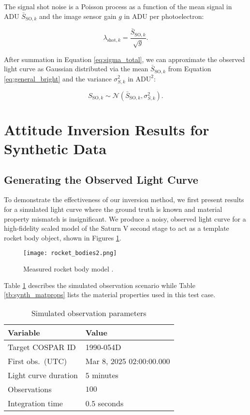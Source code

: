 \documentclass[a4paper,twocolumn]{spaceDebrisC} %
\newcommand{\figsmall}[0]{0.3\textwidth}
\begin{document}
The signal shot noise is a Poisson process as a function of the mean signal in ADU $\bar{S}_{\text{SO},k}$ and the image sensor gain $g$ in ADU per photoelectron:

\begin{equation}
  \lambda_{\text{shot},k} = \frac{\bar{S}_{\text{SO},k}}{\sqrt{g}}.
\end{equation}

After summation in Equation \ref{eq:sigma_total}, we can approximate the observed light curve as Gaussian distributed via the mean $\bar{S}_{\text{SO},k}$ from Equation \ref{eq:general_bright} and the variance $\sigma^2_{S,k}$ in $\text{ADU}^2$:

\begin{equation} \label{eq:lc_dist}
 S_{\text{SO},k} \sim \mathcal{N}\left( \bar{S}_{\text{SO},k}, \sigma^2_{S,k} \right).
 \end{equation}

\section{Attitude Inversion Results for Synthetic Data}

\subsection{Generating the Observed Light Curve}

To demonstrate the effectiveness of our inversion method, we first present results for a simulated light curve where the ground truth is known and material property mismatch is insignificant. We produce a noisy, observed light curve for a high-fidelity scaled model of the Saturn V second stage to act as a template rocket body object, shown in Figures \ref{fig:meas_model}.

\begin{figure}[H]
  \centering
  \texttt{[image: rocket\_bodies2.png]}
  \caption{Measured rocket body model \cite{nasa_models}.}
  \label{fig:meas_model}
\end{figure}

Table \ref{tb:case1_in} describes the simulated observation scenario while Table \ref{tb:synth_matprops} lists the material properties used in this test case.

\begin{table}[H]
  \centering
  \caption{Simulated observation parameters}
  \vspace*{6pt}
  \begin{tabular}{|l|l|}
  \hline
  \textbf{Variable} & \textbf{Value} \\ \hline
  Target COSPAR ID & 1990-054D \\ \hline
  First obs.\ (UTC) & Mar 8, 2025 02:00:00.000 \\ \hline
  Light curve duration & $5$ minutes \\ \hline
  Observations & $100$ \\ \hline
  Integration time & $0.5$ seconds \\ \hline
  \end{tabular}
  \label{tb:case1_in}
\end{table}
\end{document}
